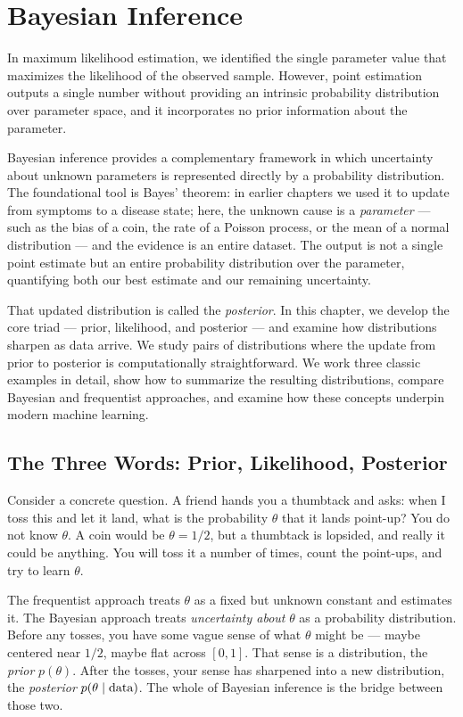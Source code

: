 \chapter{Bayesian Inference}

In maximum likelihood estimation, we identified the single parameter value that maximizes
the likelihood of the observed sample. However, point estimation outputs a single number
without providing an intrinsic probability distribution over parameter space, and it incorporates
no prior information about the parameter.

Bayesian inference provides a complementary framework in which uncertainty about unknown
parameters is represented directly by a probability distribution. The foundational tool
is Bayes' theorem: in earlier chapters we used it to update from symptoms to a disease state;
here, the unknown cause is a \emph{parameter} --- such as the bias of a coin, the rate of a
Poisson process, or the mean of a normal distribution --- and the evidence is an entire dataset.
The output is not a single point estimate but an entire probability distribution over the
parameter, quantifying both our best estimate and our remaining uncertainty.

That updated distribution is called the \emph{posterior}. In this chapter, we develop the core
triad --- prior, likelihood, and posterior --- and examine how distributions sharpen as data
arrive. We study pairs of distributions where the update from prior to posterior is
computationally straightforward. We work three classic examples in detail, show how to summarize
the resulting distributions, compare Bayesian and frequentist approaches, and examine how these
concepts underpin modern machine learning.

\chapterline

\section{The Three Words: Prior, Likelihood, Posterior}
\label{ch31:three-words}

Consider a concrete question. A friend hands you a thumbtack and
asks: when I toss this and let it land, what is the probability $\theta$ that it lands
point-up? You do not know $\theta$. A coin would be $\theta = 1/2$, but a thumbtack is
lopsided, and really it could be anything. You will toss it a number of times, count the
point-ups, and try to learn $\theta$.

The frequentist approach treats $\theta$ as a fixed but unknown constant and estimates
it. The Bayesian approach treats
\emph{uncertainty about} $\theta$ as a probability distribution. Before any tosses,
you have some vague sense of what $\theta$ might be --- maybe centered near $1/2$, maybe
flat across $[0,1]$. That sense is a distribution, the \emph{prior} $p(\theta)$. After the
tosses, your sense has sharpened into a new distribution, the \emph{posterior}
$p(\theta \mid \text{data})$. The whole of Bayesian inference is the bridge between
those two.

